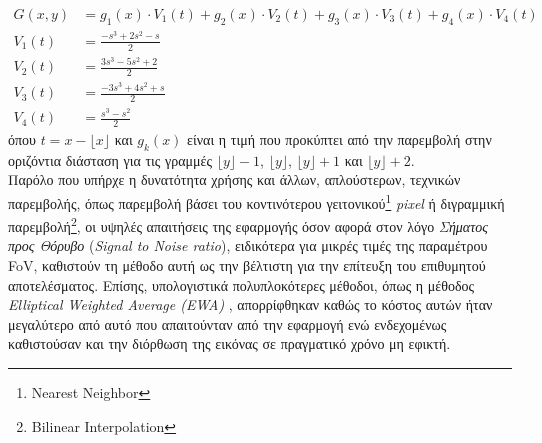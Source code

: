 \begin{subequations}
\label{equation:eqtn25}
\begin{align}
G(x,y)&=g_{1}(x)\cdot V_{1}(t) + g_{2}(x)\cdot V_{2}(t) + g_{3}(x)\cdot V_{3}(t) + g_{4}(x)\cdot V_{4}(t)\label{equation:eqtn25a}\\
V_{1}(t)&=\frac{-s^{3} + 2s^{2} - s}{2}\label{equation:eqtn25b}\\
V_{2}(t)&=\frac{3s^{3} - 5s^{2} + 2}{2}\label{equation:eqtn25c}\\
V_{3}(t)&=\frac{-3s^{3} + 4s^{2} + s}{2}\label{equation:eqtn25d}\\
V_{4}(t)&=\frac{s^{3} - s^{2}}{2}\label{equation:eqtn25e}
\end{align}
\end{subequations}
\noindent
όπου \(t = x - \lfloor x \rfloor\) και \(g_{k}(x)\) είναι η τιμή που προκύπτει από την παρεμβολή στην οριζόντια διάσταση για τις γραμμές \(\lfloor y \rfloor - 1\), \(\lfloor y \rfloor\), \(\lfloor y \rfloor + 1\) και \(\lfloor y \rfloor + 2\).\\
\indent
Παρόλο που υπήρχε η δυνατότητα χρήσης και άλλων, απλούστερων, τεχνικών παρεμβολής, όπως παρεμβολή βάσει του κοντινότερου γειτονικού\footnote{\small Nearest Neighbor} \textsl{pixel} ή διγραμμική παρεμβολή\footnote{\small Bilinear Interpolation}, οι υψηλές απαιτήσεις της εφαρμογής όσον αφορά στον λόγο \textsl{Σήματος προς Θόρυβο} (\textsl{Signal to Noise ratio}), ειδικότερα για μικρές τιμές της παραμέτρου \ac{FoV}, καθιστούν τη μέθοδο αυτή ως την βέλτιστη για την επίτευξη του επιθυμητού αποτελέσματος. Επίσης, υπολογιστικά πολυπλοκότερες μέθοδοι, όπως η μέθοδος \textsl{Elliptical Weighted Average (EWA)} \cite{GreeneHeckbert86}, απορρίφθηκαν καθώς το κόστος αυτών ήταν μεγαλύτερο από αυτό που απαιτούνταν από την εφαρμογή ενώ ενδεχομένως καθιστούσαν και την διόρθωση της εικόνας σε πραγματικό χρόνο μη εφικτή.\\
\indent

